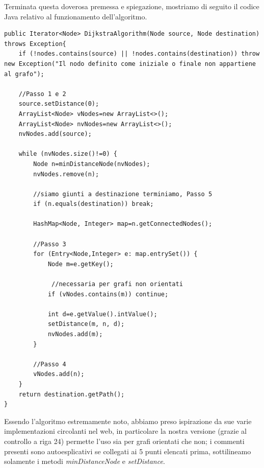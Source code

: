 Terminata questa doverosa premessa e spiegazione, mostriamo di seguito il codice Java relativo al funzionamento dell'algoritmo.
\begin{lstlisting}[style=Java]
public Iterator<Node> DijkstraAlgorithm(Node source, Node destination) throws Exception{
	if (!nodes.contains(source) || !nodes.contains(destination)) throw new Exception("Il nodo definito come iniziale o finale non appartiene al grafo");
		
	//Passo 1 e 2
	source.setDistance(0);
	ArrayList<Node> vNodes=new ArrayList<>();
	ArrayList<Node> nvNodes=new ArrayList<>();
	nvNodes.add(source);
		
	while (nvNodes.size()!=0) {
		Node n=minDistanceNode(nvNodes);
		nvNodes.remove(n);
		
		//siamo giunti a destinazione terminiamo, Passo 5
		if (n.equals(destination)) break;
		
		HashMap<Node, Integer> map=n.getConnectedNodes();
			
		//Passo 3
		for (Entry<Node,Integer> e: map.entrySet()) {
			Node m=e.getKey();
			
			 //necessaria per grafi non orientati
			if (vNodes.contains(m)) continue;
			
			int d=e.getValue().intValue();
			setDistance(m, n, d);
			nvNodes.add(m);
		}
			
		//Passo 4
		vNodes.add(n);
	}
	return destination.getPath();
}
\end{lstlisting}
\vspace{3mm}

Essendo l'algoritmo estremamente noto, abbiamo preso ispirazione da sue varie implementazioni circolanti nel web, in particolare la nostra versione (grazie al controllo a riga 24) permette l'uso sia per grafi orientati che non; i commenti presenti sono autoesplicativi se collegati ai 5 punti elencati prima, sottilineamo solamente i metodi \textit{minDistanceNode} e \textit{setDistance}.

